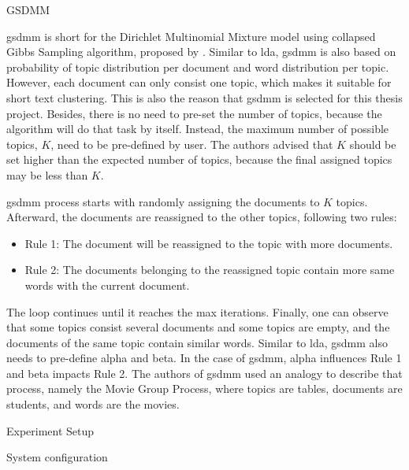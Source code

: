 \documentclass[a4paper,man,floatsintext,natbib,noextraspace]{apa6}
\makeatletter
\renewcommand{\section}{\@startsection {section}{1}
  {\z@}
  {\b@level@one@skip}
  {\e@level@one@skip}
  {\centering\normalfont\bfseries}}
\renewcommand{\subsection}{\@startsection{subsection}{2}
  {\z@}
  {\b@level@two@skip}
  {\e@level@two@skip}
  {\normalfont\normalsize\bfseries}}
\renewcommand{\subsubsection}{\@startsection{subsubsection}{3}
  {\z@}
  {\b@level@two@skip}
  {\e@level@two@skip}
  {\normalfont\normalsize\bfseries\itshape}}
\makeatother
\begin{document}
\subsubsection{GSDMM}

\gls{gsdmm} is short for the Dirichlet Multinomial Mixture model using collapsed Gibbs Sampling algorithm, proposed by \cite{yinDirichletMultinomialMixture2014}. Similar to \gls{lda}, \gls{gsdmm} is also based on probability of topic distribution per document and word distribution per topic. However, each document can only consist one topic, which makes it suitable for short text clustering. This is also the reason that \gls{gsdmm} is selected for this thesis project. Besides, there is no need to pre-set the number of topics, because the algorithm will do that task by itself. Instead, the maximum number of possible topics, $K$, need to be pre-defined by user. The authors advised that $K$ should be set higher than the expected number of topics, because the final assigned topics may be less than $K$.

\gls{gsdmm} process starts with randomly assigning the documents to $K$ topics. Afterward, the documents are reassigned to the other topics, following two rules:

\begin{itemize}
    \item Rule 1: The document will be reassigned to the topic with more documents.
    \item Rule 2: The documents belonging to the reassigned topic contain more same words with the current document.
\end{itemize}

The loop continues until it reaches the max iterations. Finally, one can observe that some topics consist several documents and some topics are empty, and the documents of the same topic contain similar words. Similar to \gls{lda}, \gls{gsdmm} also needs to pre-define alpha and beta. In the case of \gls{gsdmm}, alpha influences Rule 1 and beta impacts Rule 2. The authors of \gls{gsdmm} used an analogy to describe that process, namely the Movie Group Process, where topics are tables, documents are students, and words are the movies. 

\section{Experiment Setup} \label{sec:experiment_setup}

\subsection{System configuration}
\end{document}
